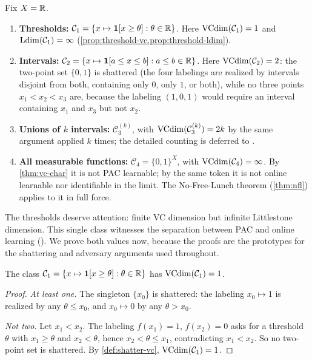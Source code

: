 \begin{example}
\label{ex:concept-classes}
Fix $X = \mathbb{R}$.
\begin{enumerate}[label=(\alph*),leftmargin=*,itemsep=3pt]
\item \textbf{Thresholds:} $\mathcal{C}_1 = \{x \mapsto \mathbf{1}[x \geq \theta] : \theta \in \mathbb{R}\}$. Here $\mathrm{VCdim}(\mathcal{C}_1) = 1$ and $\mathrm{Ldim}(\mathcal{C}_1) = \infty$ (\cref{prop:threshold-vc,prop:threshold-ldim}).
\item \textbf{Intervals:} $\mathcal{C}_2 = \{x \mapsto \mathbf{1}[a \leq x \leq b] : a \leq b \in \mathbb{R}\}$. Here $\mathrm{VCdim}(\mathcal{C}_2) = 2$: the two-point set $\{0,1\}$ is shattered (the four labelings are realized by intervals disjoint from both, containing only $0$, only $1$, or both), while no three points $x_1 < x_2 < x_3$ are, because the labeling $(1,0,1)$ would require an interval containing $x_1$ and $x_3$ but not $x_2$.
\item \textbf{Unions of $k$ intervals:} $\mathcal{C}_3^{(k)}$, with $\mathrm{VCdim}(\mathcal{C}_3^{(k)}) = 2k$ by the same argument applied $k$ times; the detailed counting is deferred to .
\item \textbf{All measurable functions:} $\mathcal{C}_4 = \{0,1\}^X$, with $\mathrm{VCdim}(\mathcal{C}_4) = \infty$. By \cref{thm:vc-char} it is not PAC learnable; by the same token it is not online learnable nor identifiable in the limit. The No-Free-Lunch theorem (\cref{thm:nfl}) applies to it in full force.
\end{enumerate}
The thresholds deserve attention: finite VC dimension but infinite Littlestone dimension. This single class witnesses the separation between PAC and online learning (). We prove both values now, because the proofs are the prototypes for the shattering and adversary arguments used throughout.
\end{example}

\begin{prop}
\label{prop:threshold-vc}
The class $\mathcal{C}_1 = \{x \mapsto \mathbf{1}[x \geq \theta] : \theta \in \mathbb{R}\}$ has $\mathrm{VCdim}(\mathcal{C}_1) = 1$.
\end{prop}

\begin{proof}
\emph{At least one.} The singleton $\{x_0\}$ is shattered: the labeling $x_0 \mapsto 1$ is realized by any $\theta \leq x_0$, and $x_0 \mapsto 0$ by any $\theta > x_0$.

\emph{Not two.} Let $x_1 < x_2$. The labeling $f(x_1) = 1$, $f(x_2) = 0$ asks for a threshold $\theta$ with $x_1 \geq \theta$ and $x_2 < \theta$, hence $x_2 < \theta \leq x_1$, contradicting $x_1 < x_2$. So no two-point set is shattered. By \cref{def:shatter-vc}, $\mathrm{VCdim}(\mathcal{C}_1) = 1$.
\end{proof}

